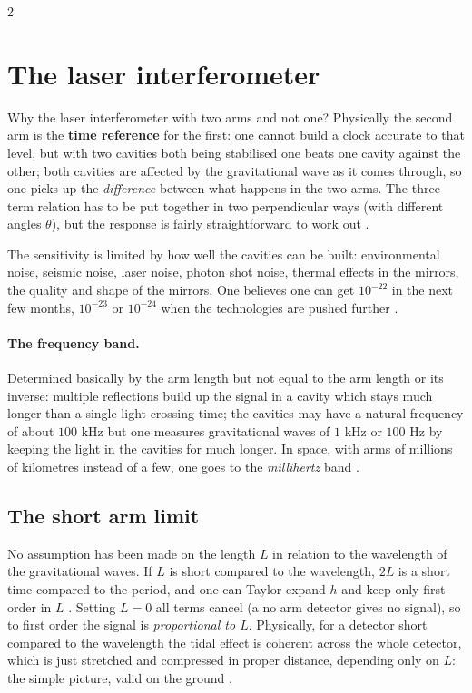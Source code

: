 \begin{paracol}{2}
\section{The laser interferometer}\label{sec:c28-interferometer}

Why the laser interferometer with two arms and not one? Physically the second arm is the \textbf{time reference} for the first: one cannot build a clock accurate to that level, but with two cavities both being stabilised one beats one cavity against the other; both cavities are affected by the gravitational wave as it comes through, so one picks up the \emph{difference} between what happens in the two arms. The three term relation has to be put together in two perpendicular ways (with different angles $\theta$), but the response is fairly straightforward to work out .

The sensitivity is limited by how well the cavities can be built: environmental noise, seismic noise, laser noise, photon shot noise, thermal effects in the mirrors, the quality and shape of the mirrors. One believes one can get $10^{-22}$ in the next few months, $10^{-23}$ or $10^{-24}$ when the technologies are pushed further .

\paragraph{The frequency band.} Determined basically by the arm length but not equal to the arm length or its inverse: multiple reflections build up the signal in a cavity which stays much longer than a single light crossing time; the cavities may have a natural frequency of about $100$ kHz but one measures gravitational waves of $1$ kHz or $100$ Hz by keeping the light in the cavities for much longer. In space, with arms of millions of kilometres instead of a few, one goes to the \emph{millihertz} band .

\subsection{The short arm limit}

No assumption has been made on the length $L$ in relation to the wavelength of the gravitational waves. If $L$ is short compared to the wavelength, $2L$ is a short time compared to the period, and one can Taylor expand $h$ and keep only first order in $L$ . Setting $L=0$ all terms cancel (a no arm detector gives no signal), so to first order the signal is \emph{proportional to $L$}. Physically, for a detector short compared to the wavelength the tidal effect is coherent across the whole detector, which is just stretched and compressed in proper distance, depending only on $L$: the simple picture, valid on the ground .


\end{paracol}

